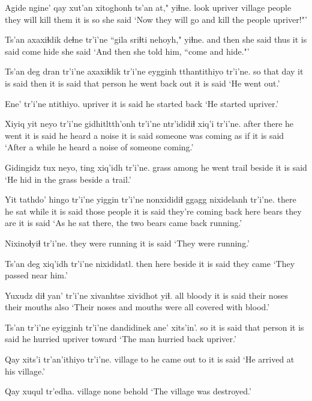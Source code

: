 \documentclass[12pt]{article}
\begin{document}
\gll Agide  ngine'  qay  xut'an xitoghonh {ts'an at,"} yiɬne.
look  upriver  village  people {they will kill them} {it is so} {she said}
\glt `Now they will go and kill the people upriver!"'
\glend

\gll Ts'an axaxiɬdik deɬne  tr'i'ne ``gila {sriɬti nehoyh,"} yiɬne.
and then {she said thus} {it is said} come hide  {she said}
\glt `And then she told him, ``come and hide."'
\glend

\gll Ts'an deg dran tr'i'ne axaxiɬdik tr'i'ne eygginh tthantithiyo tr'i'ne. 
so that day {it is said} then  {it is said} {that person} {he went back out} {it is said} 
\glt `He went out.'
\glend

\gll Ene'  tr'i'ne ntithiyo.
upriver  {it is said} {he started back}
\glt `He started upriver.'
\glend

\gll Xiyiq yit neyo  tr'i'ne gidhitltth'onh tr'i'ne ntr'ididiɬ  xiq'i tr'i'ne.
after  there {he went} {it is said} {he heard a noise} {it is said} {someone was coming} {as if} {it is said}
\glt `After a while he heard a noise of someone coming.'
\glend

\gll Gidingidz tux neyo,  ting xiq'idh tr'i'ne.
grass  among {he went} trail beside  {it is said}
\glt `He hid in the grass beside a trail.'
\glend

\gll Yit tathdo' hingo tr'i'ne yiggin tr'i'ne nonxididiɬ ggagg  nixidelanh tr'i'ne. 
there {he sat} while {it is said} {those people} {it is said} {they're coming back here} bears {they are} {it is said} 
\glt `As he sat there, the two bears came back running.'
\glend

\gll Nixinoɬyiɬ tr'i'ne. 
{they were running} {it is said} 
\glt `They were running.'
\glend

\gll Ts'an deg xiq'idh tr'i'ne nixididatl.
then here beside  {it is said} {they came}
\glt `They passed near him.'
\glend

\gll Yuxudz {diɬ yan'} tr'i'ne xivanhtse xividhot yiɬ.
all  bloody  {it is said} {their noses} {their mouths} also
\glt `Their noses and mouths were all covered with blood.'
\glend

\gll Ts'an tr'i'ne eyigginh tr'i'ne dandidinek ane' xits'in'.
so {it is said} {that person} {it is said} {he hurried} upriver toward
\glt `The man hurried back upriver.'
\glend

\gll Qay  xits'i tr'an'ithiyo  tr'i'ne.
village to {he came out to}  {it is said}
\glt `He arrived at his village.'
\glend

\gll Qay xuqul  tr'edha.
village none behold
\glt `The village was destroyed.'
\glend
\end{document}
